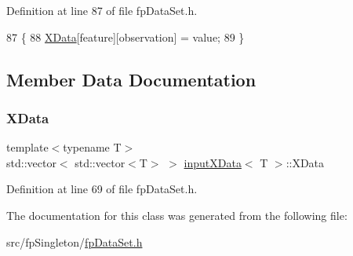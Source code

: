 Definition at line 87 of file fp\+Data\+Set.\+h.


\begin{DoxyCode}
87                                                                                             \{
88             \hyperlink{classinputXData_aff55a72217a7a3b66df91d01840e4206}{XData}[feature][observation] = value;
89         \}
\end{DoxyCode}


\subsection{Member Data Documentation}
\mbox{\label{classinputXData_aff55a72217a7a3b66df91d01840e4206}} 
\subsubsection{\texorpdfstring{X\+Data}{XData}}
{\footnotesize\ttfamily template$<$typename T$>$ \\
std\+::vector$<$ std\+::vector$<$T$>$ $>$ \hyperlink{classinputXData}{input\+X\+Data}$<$ T $>$\+::X\+Data\hspace{0.3cm}{\ttfamily [private]}}



Definition at line 69 of file fp\+Data\+Set.\+h.



The documentation for this class was generated from the following file\+:\begin{DoxyCompactItemize}
\item 
src/fp\+Singleton/\hyperlink{fpDataSet_8h}{fp\+Data\+Set.\+h}\end{DoxyCompactItemize}
